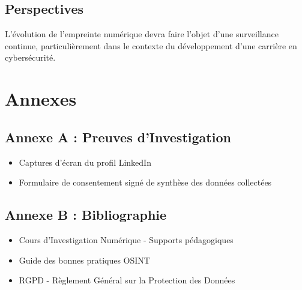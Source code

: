 \documentclass[12pt, a4paper]{article}
\begin{document}
\subsection{Perspectives}
L'évolution de l'empreinte numérique devra faire l'objet d'une surveillance continue, particulièrement dans le contexte du développement d'une carrière en cybersécurité.

\section*{Annexes}
\subsection*{Annexe A : Preuves d'Investigation}
\begin{itemize}
    \item Captures d'écran du profil LinkedIn
    \item Formulaire de consentement signé
    \tableaux de synthèse des données collectées
\end{itemize}

\subsection*{Annexe B : Bibliographie}
\begin{itemize}
    \item Cours d'Investigation Numérique - Supports pédagogiques
    \item Guide des bonnes pratiques OSINT
    \item RGPD - Règlement Général sur la Protection des Données
\end{itemize}
\end{document}
